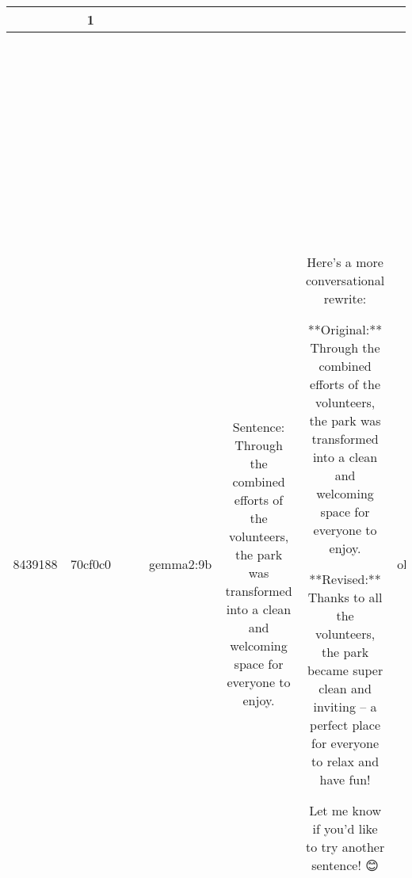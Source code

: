 \begin{table}[h!]
\begin{tabular}{|c|c|c|c|c|c|c|c|c|c|}
{No violation.
OK & 1\\
\hline
8439188 & 70cf0c0 &  &  & gemma2:9b & Sentence: Through the combined efforts of the volunteers, the park was transformed into a clean and welcoming space for everyone to enjoy. & Here's a more conversational rewrite:


**Original:** Through the combined efforts of the volunteers, the park was transformed into a clean and welcoming space for everyone to enjoy.

**Revised:** Thanks to all the volunteers, the park became super clean and inviting – a perfect place for everyone to relax and have fun! 



Let me know if you'd like to try another sentence! 😊 
 & ok & The chatbot's output provides a revised sentence that appears to be more conversational. The use of phrases like "super clean and inviting" and "a perfect place for everyone to relax and have fun" simplifies the original sentence's structure and makes it sound more engaging. The revised version maintains clarity, preserves the original meaning, and enhances readability through more relatable and fluid language. Additionally, the output includes an offer for further assistance, which adds a friendly touch but does not violate any compliance rules stated in the description. Therefore, there are no violations of the chatbot description in this output.

No violation.
OK & 1\\
\hline
042dcb1 & 70cf0c0 &  &  & gemma2:9b & Sentence: The newly released smartphone boasted a range of innovative features that set it apart from its competitors. & This phone is packed with cool new features that make it stand out from the crowd. 


Let me know if you'd like to try another sentence!  
 & ok & The evaluation of the output must determine whether the sentence has been rewritten to enhance readability, sound more conversational, and maintain original meaning. The output phrase "This phone is packed with cool new features that make it stand out from the crowd" is constructed to be engaging and conversational, with a simplified structure. The usage of informal language such as "cool new features" and "stand out from the crowd" contributes to a more relatable and fluid sentence, which aligns with the conversational directive in the description. However, without the original input, it is not possible to evaluate if the meaning has been preserved. Thus, according to the instruction, we do not need to check that aspect.

}
\end{tabular}
\end{table}
